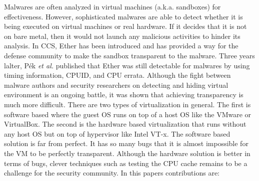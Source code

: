 Malwares are often analyzed in virtual machines (a.k.a. sandboxes) for effectiveness. However, sophisticated malwares are able to detect whether it is being executed on virtual machines or real hardware. If it decides that it is not on bare metal, then it would not launch any malicious activities to hinder its analysis. In CCS, Ether \cite{ether} has been introduced and has provided a way for the defense community to make the sandbox transparent to the malware. Three years lalter, P{\'e}k \textit{et al.}\cite{nether} published that Ether\cite{ether} was still detectable for malwares by using timing information, CPUID, and CPU errata. Although the fight between malware authors and security researchers on detecting and hiding virtual environment is an ongoing battle, it was shown that achieving transparency is much more difficult.
There are two types of virtualization in general. The first is software based where the guest OS runs on top of a host OS like the VMware or VirtualBox. The second is the hardware based virtualization that runs without any host OS but on top of hypervisor like Intel VT-x. The software based solution is far from perfect. It has so many bugs that it is almost impossible for the VM to be perfectly transparent. Although the hardware solution is better in terms of bugs, clever techniques such as testing the CPU cache remains to be a challenge for the security community.
In this paper\textquotesingle s contributions are:


